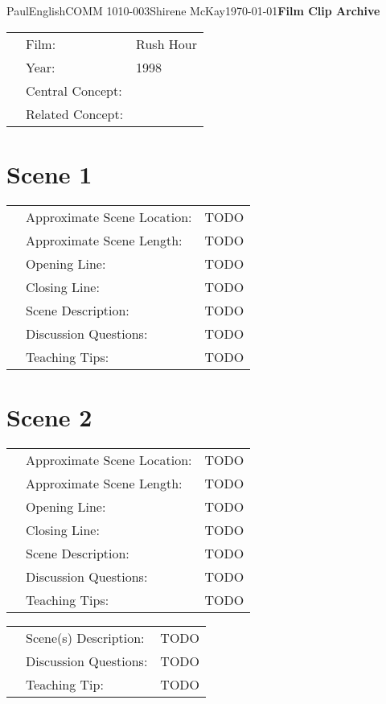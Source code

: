 \documentclass[12pt,letterpaper]{article}
\begin{document}
\begin{mla}{Paul}{English}{COMM 1010-003}{Shirene
    McKay}{\today}{\textbf{Film Clip Archive}}


\begin{listliketab} 
\begin{tabular}{Lll}
& Film: & Rush Hour \\
& Year: & 1998 \\
& Central Concept: & \\
& Related Concept: & \\
\end{tabular} 
\end{listliketab}

\section*{Scene 1}

\begin{listliketab} 
\begin{tabular}{Lll}
& Approximate Scene Location: & TODO \\
& Approximate Scene Length: & TODO \\
& Opening Line: & TODO \\
& Closing Line: & TODO \\
& Scene Description: & TODO \\
& Discussion Questions: & TODO \\
& Teaching Tips: & TODO
\end{tabular} 
\end{listliketab}



\section*{Scene 2}

\begin{listliketab} 
\begin{tabular}{Lll}
& Approximate Scene Location: & TODO \\
& Approximate Scene Length: & TODO \\
& Opening Line: & TODO \\
& Closing Line: & TODO \\
& Scene Description: & TODO \\
& Discussion Questions: & TODO \\
& Teaching Tips: & TODO \\
\end{tabular} 
\end{listliketab}



\begin{listliketab} 
\begin{tabular}{Lll}
& Scene(s) Description: & TODO \\
& Discussion Questions: & TODO \\
& Teaching Tip: & TODO \\
\end{tabular} 
\end{listliketab}


\end{mla}
\end{document}
